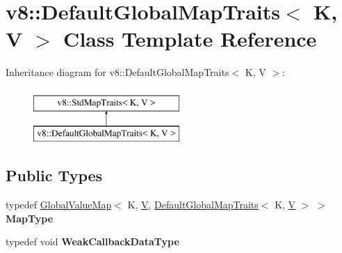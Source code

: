 \hypertarget{classv8_1_1DefaultGlobalMapTraits}{}\section{v8\+:\+:Default\+Global\+Map\+Traits$<$ K, V $>$ Class Template Reference}
\label{classv8_1_1DefaultGlobalMapTraits}
Inheritance diagram for v8\+:\+:Default\+Global\+Map\+Traits$<$ K, V $>$\+:\begin{figure}[H]
\begin{center}
\leavevmode
\includegraphics[height=2.000000cm]{classv8_1_1DefaultGlobalMapTraits}
\end{center}
\end{figure}
\subsection*{Public Types}
\begin{DoxyCompactItemize}
\item 
\mbox{\label{classv8_1_1DefaultGlobalMapTraits_a6626b089621a436fde5ac1a1132cc83c}} 
typedef \mbox{\hyperlink{classv8_1_1GlobalValueMap}{Global\+Value\+Map}}$<$ K, \mbox{\hyperlink{classV}{V}}, \mbox{\hyperlink{classv8_1_1DefaultGlobalMapTraits}{Default\+Global\+Map\+Traits}}$<$ K, \mbox{\hyperlink{classV}{V}} $>$ $>$ {\bfseries Map\+Type}
\item 
\mbox{\label{classv8_1_1DefaultGlobalMapTraits_af5285197aae83dcb00d0381fbc90869e}} 
typedef void {\bfseries Weak\+Callback\+Data\+Type}
\end{DoxyCompactItemize}
